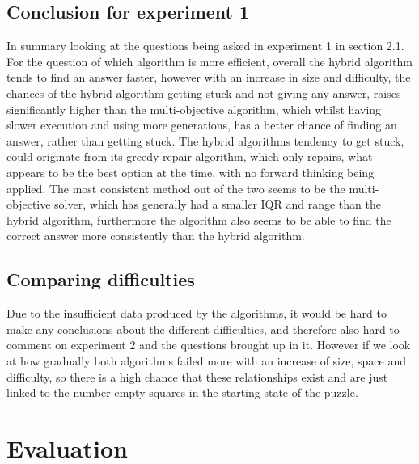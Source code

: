 \documentclass[a4paper,11pt]{article}
\begin{document}
\subsection{Conclusion for experiment 1}
In summary looking at the questions being asked in experiment 1 in section 2.1. For the question of which algorithm is more efficient, overall the hybrid algorithm tends to find an answer faster, however with an increase in size and difficulty, the chances of the hybrid algorithm getting stuck and not giving any answer, raises significantly higher than the multi-objective algorithm, which whilst having slower execution and using more generations, has a better chance of finding an answer, rather than getting stuck. The hybrid algorithms tendency to get stuck, could originate from its greedy repair algorithm, which only repairs, what appears to be the best option at the time, with no forward thinking being applied. The most consistent method out of the two seems to be the multi-objective solver, which has generally had a smaller IQR and range than the hybrid algorithm, furthermore the algorithm also seems to be able to find the correct answer more consistently than the hybrid algorithm.  


\subsection{Comparing difficulties}
Due to the insufficient data produced by the algorithms, it would be hard to make any conclusions about the different difficulties, and therefore also hard to comment on experiment 2 and the questions brought up in it. However if we look at how gradually both algorithms failed more with an increase of size, space and difficulty, so there is a high chance that these relationships exist and are just linked to the number empty squares in the starting state of the puzzle.

\section{Evaluation}
\end{document}

